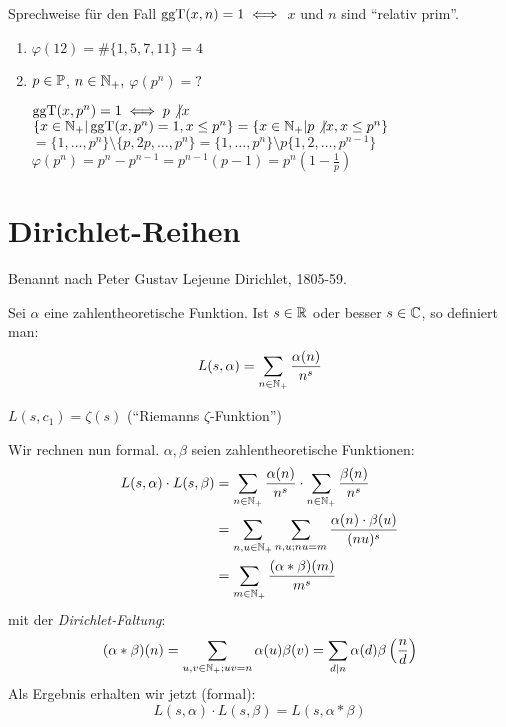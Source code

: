 \documentclass[a4paper,twoside,DIV15,BCOR12mm]{scrbook}
\begin{document}
Sprechweise für den Fall $\mathop{\rm ggT}\nolimits(x,n) = 1 \iff$ $x$ und $n$ sind
"`relativ prim"'.

\begin{beispiel}
\begin{enumerate}
\item $\varphi(12) = \#\{1,5,7,11\} = 4$
\item $p\in\mathbb{P}$, $n\in\mathbb{N}_+,$ $\varphi(p^n) = ?$

$\mathop{\rm ggT}\nolimits(x,p^n) = 1 \iff p\not|x$\\
$\{x\in\mathbb{N}_+|\mathop{\rm ggT}\nolimits(x,p^n) = 1 , x \le p^n\} = \{x\in\mathbb{N}_+| p \not| x, x \le p^n\}$\\
$= \{1,\ldots,p^n\} \setminus \{p,2p,\ldots,p^n\} = \{1,\ldots,p^n\}\setminus p \{1,2,\ldots,p^{n-1}\}$\\
$\varphi(p^n) = p^n-p^{n-1} = p^{n-1}(p-1) = p^n(1-\frac 1 p )$

\end{enumerate}
\end{beispiel}


\section{Dirichlet-Reihen}
Benannt nach Peter Gustav Lejeune Dirichlet, 1805-59.

\begin{definition}
Sei $\alpha$ eine zahlentheoretische Funktion. Ist $s\in\mathbb{R}$ oder
besser $s\in\mathbb{C}$, so definiert man:
\[ L(s,\alpha) = \sum_{n\in\mathbb{N}_+} \frac{\alpha(n)}{n^s} \]
\end{definition}

\begin{beispiel}
$L(s,c_1) = \zeta(s)$ ("`Riemanns $\zeta$-Funktion"')
\end{beispiel}

Wir rechnen nun formal. $\alpha,\beta$ seien zahlentheoretische
Funktionen:
\begin{align*}
L(s,\alpha)\cdot L(s,\beta) &= \sum_{n\in\mathbb{N}_+} \frac{\alpha(n)}{n^s} \cdot \sum_{n\in\mathbb{N}_+} \frac{\beta(n)}{n^s} \\
&=  \sum_{n,u\in\mathbb{N}_+} \sum_{n,u; nu=m} \frac{\alpha(n) \cdot \beta(u)}{(nu)^s} \\
&= \sum_{m\in\mathbb{N}_+} \frac{(\alpha * \beta)(m)}{m^s}
\end{align*}
mit der \emph{Dirichlet-Faltung}: \[ (\alpha * \beta)(n) =
\sum_{u,v\in\mathbb{N}_+; uv=n} \alpha(u) \beta(v) = \sum_{d|n} \alpha(d)
\beta \left(\frac n d\right) \] Als Ergebnis erhalten wir jetzt
(formal):
\[ L(s,\alpha)\cdot L(s,\beta) = L(s,\alpha * \beta) \]
\end{document}
